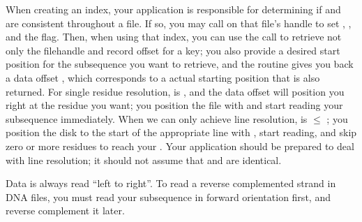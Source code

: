 When creating an index, your application is responsible for
determining if  and  are consistent throughout a
file. If so, you may call  on that
file's handle to set , , and the
 flag. Then, when using that index, you can
use the  call to retrieve not only the
filehandle  and record offset  for a key; you
also provide a desired start position  for the
subsequence you want to retrieve, and the routine gives you back a
data offset , which corresponds to a actual starting
position  that is also returned. For single
residue resolution,  is ,
and the data offset  will position you right at the
residue you want; you position the file with  and
start reading your subsequence immediately. When we can only achieve
line resolution,  is $\leq$
; you position the disk to the start of the
appropriate line with , start reading, and skip zero
or more residues to reach your . Your
application should be prepared to deal with line resolution; it should
not assume that  and  are
identical.

Data is always read ``left to right''.  To read a reverse complemented
strand in DNA files, you must read your subsequence in forward
orientation first, and reverse complement it later.



